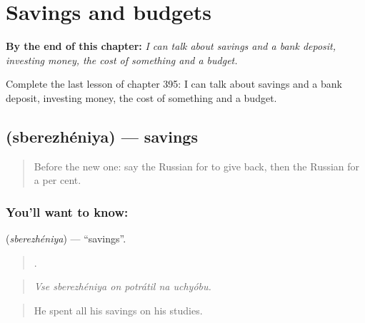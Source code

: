 
\chapter{Savings and budgets}
\label{ch:ru-savings-and-budgets}

\begin{chapteropening}
\textbf{By the end of this chapter:} \emph{I can talk about savings and a bank deposit, investing money, the cost of something and a budget.}

Complete the last lesson of chapter 395: I can talk about savings and a bank deposit, investing money, the cost of something and a budget.
\end{chapteropening}

\section[\texorpdfstring{\ru{сбережения} (sberezhéniya)}{сбережения (sberezhéniya)}]{ (sberezhéniya) — savings}

\label{lesson:RU-C395-sberezheniya}



\begin{quote}
Before the new one: say the Russian for to give back, then the Russian for a per cent.
\end{quote}

\subsection*{You'll want to know: }
\textbf{} (\emph{sberezhéniya}) — \textquotedblleft{}savings\textquotedblright{}.

\begin{quote}
     .
\end{quote}

\begin{quote}
\emph{Vse sberezhéniya on potrátil na uchyóbu.}
\end{quote}

\begin{quote}
He spent all his savings on his studies.
\end{quote}

